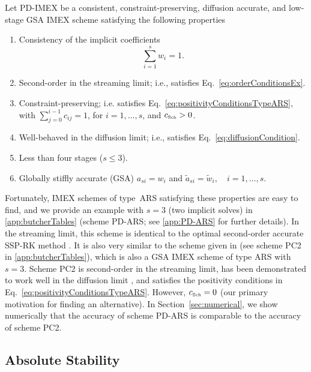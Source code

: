 \begin{define}
  Let PD-IMEX be a consistent, constraint-preserving, diffusion accurate, and low-stage GSA IMEX scheme satisfying the following properties
  \begin{enumerate}
    \item Consistency of the implicit coefficients
    \begin{equation}
      \sum_{i=1}^{s}w_{i}=1.
      \label{eq:implicitConsistency}
    \end{equation}
    \item Second-order in the streaming limit; i.e., satisfies Eq.~\eqref{eq:orderConditionsEx}.
    \item Constraint-preserving; i.e. satisfies Eq.~\eqref{eq:positivityConditionsTypeARS}, with $\sum_{j=0}^{i-1}c_{ij}=1$, for $i=1,\ldots,s$, and $c_{\mbox{\tiny Sch}}>0$.
    \item Well-behaved in the diffusion limit; i.e., satisfies Eq.~\eqref{eq:diffusionCondition}.
    \item Less than four stages ($s\le3$).
    \item Globally stiffly accurate (GSA) $a_{si}=w_{i}$ and $\tilde{a}_{si}=\tilde{w}_{i},\quad i=1,\ldots,s$.
  \end{enumerate}
  \label{def:PD-IMEX}
\end{define}
Fortunately, IMEX schemes of type~ARS satisfying these properties are easy to find, and we provide an example with $s=3$ (two implicit solves) in \ref{app:butcherTables} (scheme PD-ARS; see \ref{app:PD-ARS} for further details).  
In the streaming limit, this scheme is identical to the optimal second-order accurate SSP-RK method \cite{gottlieb_etal_2001}.  
It is also very similar to the scheme given in \cite{mcclarren_etal_2008} (see scheme PC2 in \ref{app:butcherTables}), which is also a GSA IMEX scheme of type ARS with $s=3$.  
Scheme PC2 is second-order in the streaming limit, has been demonstrated to work well in the diffusion limit \cite{mcclarren_etal_2008,radice_etal_2013}, and satisfies the positivity conditions in Eq.~\eqref{eq:positivityConditionsTypeARS}.  
However, $c_{\mbox{\tiny Sch}}=0$ (our primary motivation for finding an alternative).  
In Section~\ref{sec:numerical}, we show numerically that the accuracy of scheme PD-ARS is comparable to the accuracy of scheme PC2.  

\subsection{Absolute Stability}

